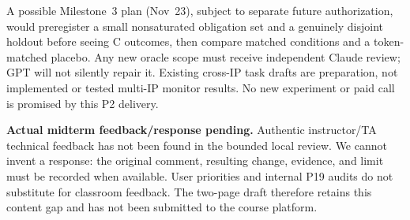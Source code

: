 \documentclass[conference,10pt,letterpaper]{IEEEtran}
\begin{document}
A possible Milestone~3 plan (Nov~23), subject to separate future authorization,
would preregister a small nonsaturated obligation set and a genuinely disjoint
holdout before seeing C outcomes, then compare matched conditions and a
token-matched placebo. Any new oracle scope must receive independent Claude
review; GPT will not silently repair it. Existing cross-IP task drafts are
preparation, not implemented or tested multi-IP monitor results. No new
experiment or paid call is promised by this P2 delivery.

\textbf{Actual midterm feedback/response pending.} Authentic instructor/TA
technical feedback has not been found in the bounded local review. We cannot
invent a response: the original comment, resulting change, evidence, and limit
must be recorded when available. User priorities and internal P19 audits do not
substitute for classroom feedback. The two-page draft therefore retains this
content gap and has not been submitted to the course platform.
\end{document}
